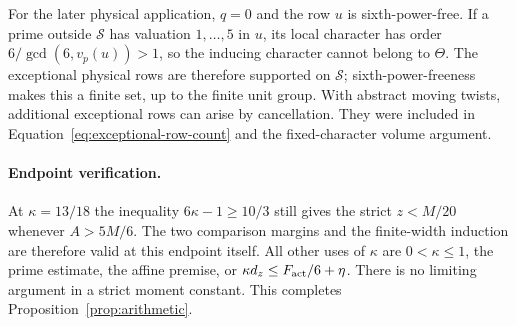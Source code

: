 \documentclass[12pt]{article}
\begin{document}
For the later physical application, \(q=0\) and the row \(u\)
is sixth-power-free.  If a prime outside \(\mathcal S\) has
valuation \(1,\ldots,5\) in \(u\), its local character has order
\(6/\gcd(6,v_p(u))>1\), so the inducing character cannot belong
to \(\Theta\).  The exceptional physical rows are therefore
supported on \(\mathcal S\); sixth-power-freeness makes this a
finite set, up to the finite unit group.  With abstract moving
twists, additional exceptional rows can arise by cancellation.
They were included in Equation~\eqref{eq:exceptional-row-count}
and the fixed-character volume argument.

\paragraph{Endpoint verification.}
At \(\kappa=13/18\) the inequality \(6\kappa-1\ge10/3\)
still gives the strict \(z<M/20\) whenever \(A>5M/6\).
The two comparison margins and the finite-width induction are therefore
valid at this endpoint itself.  All other uses of \(\kappa\) are
\(0<\kappa\le1\), the prime estimate, the affine premise, or
\(\kappa d_z\le F_{\rm act}/6+\eta\).
There is no limiting argument in a strict moment constant.
This completes Proposition~\ref{prop:arithmetic}.
\end{document}
